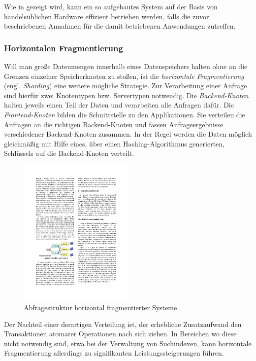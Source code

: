 Wie in  \citep{ghemawat03}  gezeigt wird, kann ein so aufgebautes System auf der Basis von handelsüblichen Hardware effizient betrieben werden, falls die zuvor beschriebenen Annahmen für die damit betriebenen Anwendungen zutreffen.  \citep{ghemawat03}

\subsubsection{Horizontalen Fragmentierung}\label{sec:sharding}

Will man große Datenmengen innerhalb eines Datenspeichers halten ohne an die Grenzen einzelner Speicherknoten zu stoßen, ist die \textit{horizontale Fragmentierung} (engl. \textit{Sharding}) eine weitere mögliche Strategie. Zur Verarbeitung einer Anfrage sind hierfür zwei Knotentypen bzw. Servertypen notwendig. Die \textit{Backend-Knoten} halten jeweils einen Teil der Daten und verarbeiten alle Anfragen dafür. Die \textit{Frontend-Knoten} bilden die Schnittstelle zu den Applikationen. Sie verteilen die Anfragen an die richtigen Backend-Knoten und fassen Anfrageergebnisse verschiedener Backend-Knoten zusammen. In der Regel werden die Daten möglich gleichmäßig mit Hilfe eines, über einen Hashing-Algorithmus generierten, Schlüssels auf die Backend-Knoten verteilt. \citep{Michael07}
\begin{figure}[H]
  \centering
    \includegraphics[width=0.5\textwidth]{Abbildungen/sharding}
    \caption[Horizonale Fragmentierung]{\footnotesize Abfragestruktur horizontal fragmentierter Systeme {\footnotemark} }
    \label{fig:sharding}
\end{figure}

Der Nachteil einer derartigen Verteilung ist, der erhebliche Zusatzaufwand den Transaktionen atomarer Operationen nach sich ziehen. In Bereichen wo diese nicht notwendig sind, etwa bei der Verwaltung von Suchindexen, kann horizontale Fragmentierung allerdings zu signifikanten Leistungssteigerungen führen. \citep{Michael07}


